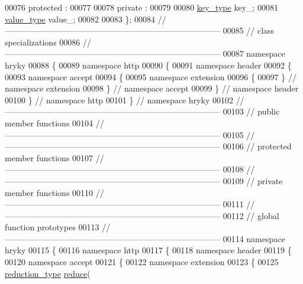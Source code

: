 \begin{DoxyCode}
00076 \textcolor{keyword}{protected} :
00077 
00078 \textcolor{keyword}{private} :
00079 
00080     \hyperlink{classhryky_1_1_vector}{key_type} key\_;
00081     \hyperlink{classhryky_1_1_vector}{value_type} value\_;
00082 
00083 \};
00084 \textcolor{comment}{//
      ------------------------------------------------------------------------------}
00085 \textcolor{comment}{// class specializations}
00086 \textcolor{comment}{//
      ------------------------------------------------------------------------------}
00087 \textcolor{keyword}{namespace }hryky
00088 \{
00089 \textcolor{keyword}{namespace }http
00090 \{
00091 \textcolor{keyword}{namespace }header
00092 \{
00093 \textcolor{keyword}{namespace }accept
00094 \{
00095 \textcolor{keyword}{namespace }extension
00096 \{
00097 \} \textcolor{comment}{// namespace extension}
00098 \} \textcolor{comment}{// namespace accept}
00099 \} \textcolor{comment}{// namespace header}
00100 \} \textcolor{comment}{// namespace http}
00101 \} \textcolor{comment}{// namespace hryky}
00102 \textcolor{comment}{//
      ------------------------------------------------------------------------------}
00103 \textcolor{comment}{// public member functions}
00104 \textcolor{comment}{//
      ------------------------------------------------------------------------------}
00105 \textcolor{comment}{//
      ------------------------------------------------------------------------------}
00106 \textcolor{comment}{// protected member functions}
00107 \textcolor{comment}{//
      ------------------------------------------------------------------------------}
00108 \textcolor{comment}{//
      ------------------------------------------------------------------------------}
00109 \textcolor{comment}{// private member functions}
00110 \textcolor{comment}{//
      ------------------------------------------------------------------------------}
00111 \textcolor{comment}{//
      ------------------------------------------------------------------------------}
00112 \textcolor{comment}{// global function prototypes}
00113 \textcolor{comment}{//
      ------------------------------------------------------------------------------}
00114 \textcolor{keyword}{namespace }hryky
00115 \{
00116 \textcolor{keyword}{namespace }http
00117 \{
00118 \textcolor{keyword}{namespace }header
00119 \{
00120 \textcolor{keyword}{namespace }accept
00121 \{
00122 \textcolor{keyword}{namespace }extension
00123 \{
00125     \hyperlink{namespacehryky_a343a9a4c36a586be5c2693156200eadc}{reduction_type} \hyperlink{namespacehryky_1_1http_a08fc36a78a8e2908140fcd102829a566}{reduce}(

\end{DoxyCode}
